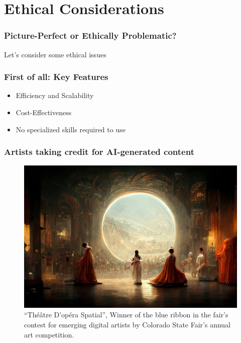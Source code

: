 \documentclass[
	11pt, compress%
]{beamer}
\begin{document}
\section{Ethical Considerations}
\begin{frame}
\begin{center}
	\frametitle{Picture-Perfect or Ethically Problematic?}
	\huge Let's consider some ethical issues
\end{center}
\end{frame}

\begin{frame}
	\frametitle{First of all: Key Features}
	\begin{itemize}
		\setlength\itemsep{2em}
		\item Efficiency and Scalability
		\item Cost-Effectiveness
		\item No specialized skills required to use
	\end{itemize}
\end{frame}

\begin{frame}
		\frametitle{Artists taking credit for AI-generated content}
		\begin{figure}
			\includegraphics[width=0.78\linewidth]{Images/ColoradoStateFairWinner.png}
			\caption{\tiny “Théâtre D’opéra Spatial”, Winner of the blue ribbon in the fair’s contest for emerging digital artists by Colorado State Fair’s annual art competition\cite{OperaSpecial}.}
		\end{figure}
	\end{frame}
\end{document}

